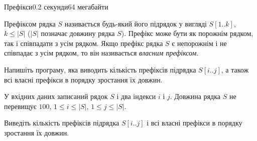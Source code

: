 \begin{problem}{Префікси}{}{}{0.2 секунди}{64 мегабайти}

Префіксом рядка $S$ називається будь-який його підрядок у вигляді $S[1..k]$, $k \le |S|$ 
($|S|$ позначає довжину рядка $S$). 
Префікс може бути як порожнім рядком, так і співпадати з усім рядком.
Якщо префікс рядка $S$ є непорожнім і не співпадає з усім рядком, 
то він називається {\it власним префіксом}. 

Напишіть програму, яка виводить кількість префіксів підрядка $S[i..j]$, а також 
всі власні префікси в порядку зростання їх довжин.

\InputFile
У вхідних даних записаний рядок $S$ і два індекси $i$ і $j$. Довжина рядка $S$ не перевищує $100$, $1 \le i \le |S|$, $1 \le j \le |S|$.

\OutputFile
Виведіть кількість префіксів підрядка $S[i..j]$
і всі власні префікси в порядку зростання їх довжин.

\Examples

\begin{example}
%
%
\end{example}

\end{problem}


